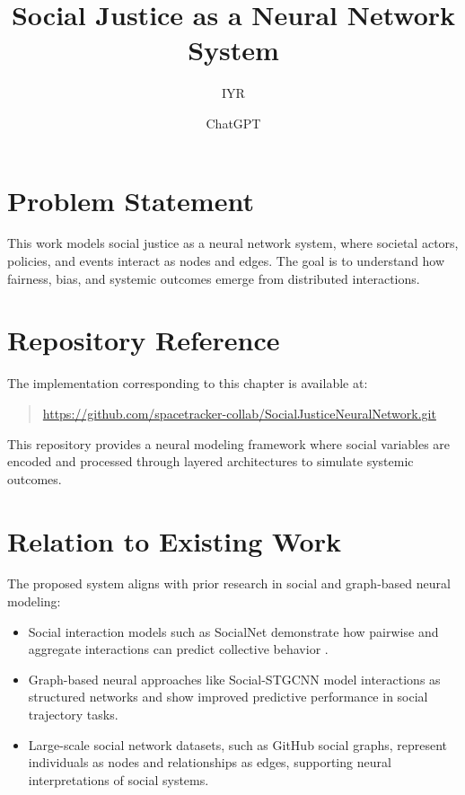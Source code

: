 \documentclass[12pt]{article}
\title{Social Justice as a Neural Network System}
\author{IYR \and ChatGPT}
\date{}
\begin{document}
\maketitle

\section*{Problem Statement}

This work models social justice as a neural network system, where societal actors, policies, and events interact as nodes and edges. The goal is to understand how fairness, bias, and systemic outcomes emerge from distributed interactions.

\section*{Repository Reference}

The implementation corresponding to this chapter is available at:

\begin{quote}
\url{https://github.com/spacetracker-collab/SocialJusticeNeuralNetwork.git}
\end{quote}

This repository provides a neural modeling framework where social variables are encoded and processed through layered architectures to simulate systemic outcomes.

\section*{Relation to Existing Work}

The proposed system aligns with prior research in social and graph-based neural modeling:

\begin{itemize}
\item Social interaction models such as SocialNet demonstrate how pairwise and aggregate interactions can predict collective behavior \cite{heras2019socialnet}.
\item Graph-based neural approaches like Social-STGCNN model interactions as structured networks and show improved predictive performance in social trajectory tasks.
\item Large-scale social network datasets, such as GitHub social graphs, represent individuals as nodes and relationships as edges, supporting neural interpretations of social systems.
\end{itemize}
\end{document}
